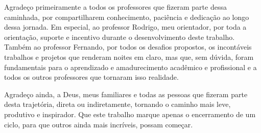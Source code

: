 
\begin{agradecimentos}

Agradeço primeiramente a todos os professores que fizeram parte dessa caminhada, por compartilharem conhecimento, paciência e dedicação ao longo dessa jornada.
Em especial, ao professor Rodrigo, meu orientador, por toda a orientação, suporte e incentivo durante o desenvolvimento deste trabalho.
Também ao professor Fernando, por todos os desafios propostos, os incontáveis trabalhos e projetos que renderam noites em claro, mas que, sem dúvida, foram fundamentais para o aprendizado e amadurecimento acadêmico e profissional e a todos os outros professores que tornaram isso realidade.

Agradeço ainda, a Deus, meus familiares e todas as pessoas que fizeram parte desta trajetória, direta ou indiretamente, tornando o caminho mais leve, produtivo e inspirador.
Que este trabalho marque apenas o encerramento de um ciclo, para que outros ainda mais incríveis, possam começar.

\end{agradecimentos}
